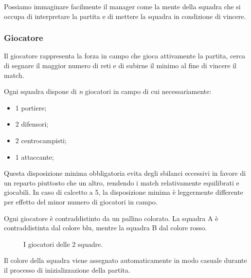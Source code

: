 \documentclass[aps,letterpaper,10pt]{article}
\begin{document}
Possiamo immaginare facilmente il manager come la mente della squadra che si occupa di interpretare la partita e di mettere la squadra in condizione di vincere.

\subsubsection{Giocatore}

Il giocatore rappresenta la forza in campo che gioca attivamente la partita, cerca di segnare il maggior numero di reti e di subirne il minimo al fine di vincere il match. \vspace{3mm}

Ogni squadra dispone di \emph{n} giocatori in campo di cui necessariamente:

\begin{itemize}
	\item 1 portiere;
	\item 2 difensori;
	\item 2 centrocampisti;
	\item 1 attaccante;
\end{itemize}

Questa disposizione minima obbligatoria evita degli sbilanci eccessivi in favore di un reparto piuttosto che un altro, rendendo i match relativamente equilibrati e giocabili. In caso di calcetto a 5, la disposizione minima \`e leggermente differente per effetto del minor numero di giocatori in campo. \vspace{3mm}

Ogni giocatore \`e contraddistinto da un pallino colorato. La squadra A \`e contraddistinta dal colore blu, mentre la squadra B dal colore rosso.

\begin{figure}[H]
  \centering
    \hspace{1cm}             
  \caption{I giocatori delle 2 squadre.}
\end{figure}

Il colore della squadra viene assegnato automaticamente in modo casuale durante il processo di inizializzazione della partita.
\end{document}
